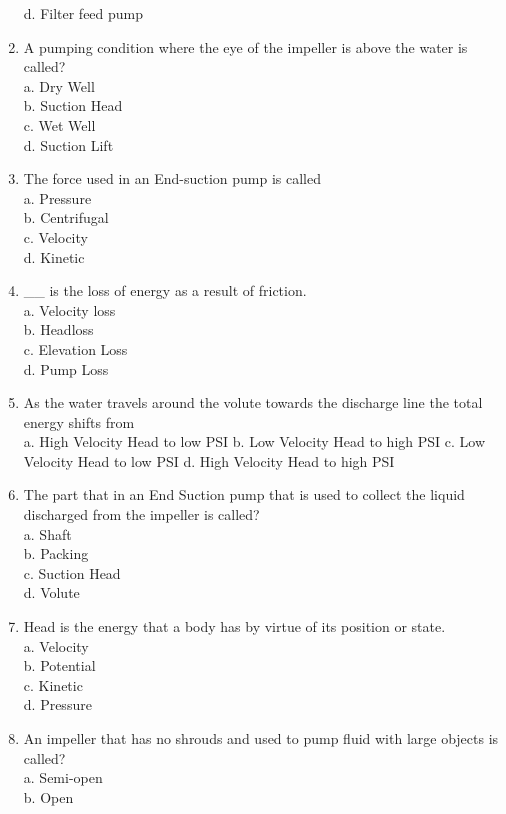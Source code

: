 \begin{enumerate}[1.]
d. Filter feed pump\\
\item A pumping condition where the eye of the impeller is above the water is called?\\
a. Dry Well\\
b. Suction Head\\
c. Wet Well\\
d. Suction Lift\\
\item The force used in an End-suction pump is called\\
a. Pressure\\
b. Centrifugal\\
c. Velocity\\
d. Kinetic\\
\item \_\_ is the loss of energy as a result of friction.\\
a. Velocity loss\\
b. Headloss\\
c. Elevation Loss\\
d. Pump Loss\\
\item As the water travels around the volute towards the discharge line the total energy shifts from\\
a. High Velocity Head to low PSI b. Low Velocity Head to high PSI c. Low Velocity Head to low PSI d. High Velocity Head to high PSI\\
\item The part that in an End Suction pump that is used to collect the liquid discharged from the impeller is called?\\
a. Shaft\\
b. Packing\\
c. Suction Head\\
d. Volute\\
\item Head is the energy that a body has by virtue of its position or state.\\
a. Velocity\\
b. Potential\\
c. Kinetic\\
d. Pressure\\
\item An impeller that has no shrouds and used to pump fluid with large objects is called?\\
a. Semi-open\\
b. Open\\

\end{enumerate}
